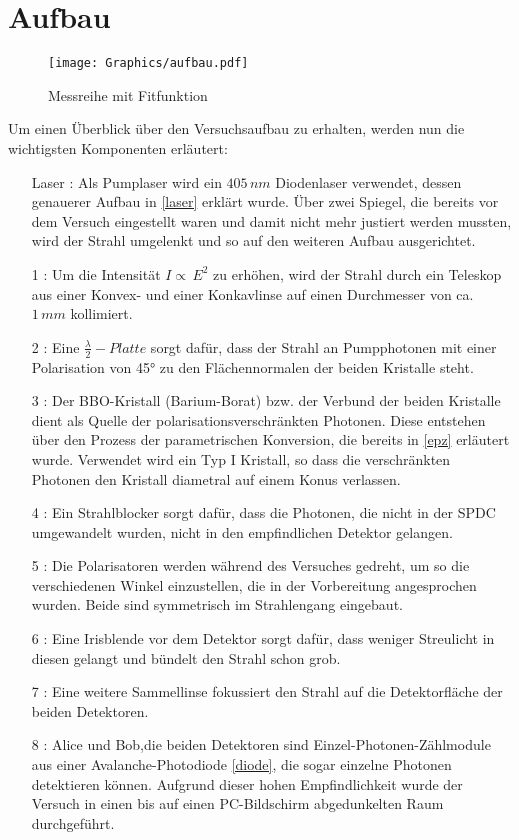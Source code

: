 \documentclass[twoside,colorback,accentcolor=tud4c,11pt]{tudreport}
\begin{document}
\section{Aufbau}
\begin{figure}[H]
\centering
   	\begin{minipage}[b]{1.0\textwidth}
   	\texttt{[image: Graphics/aufbau.pdf]}
   	\caption{Messreihe mit Fitfunktion}
  	\label{3dfit}
   	\end{minipage}
\end{figure}
Um einen Überblick über den Versuchsaufbau zu erhalten, werden nun die wichtigsten Komponenten erläutert:
\begin{itemize}
\item[Laser]: Als Pumplaser wird ein $405\,\si{nm}$ Diodenlaser verwendet, dessen genauerer Aufbau in \ref{laser} erklärt wurde. Über zwei Spiegel, die bereits vor dem Versuch eingestellt waren und damit nicht mehr justiert werden mussten, wird der Strahl umgelenkt und so auf den weiteren Aufbau ausgerichtet.
\item[1]: Um die Intensität $I\propto\,E^2$ zu erhöhen, wird der Strahl durch ein Teleskop aus einer Konvex- und einer Konkavlinse auf einen Durchmesser von ca. $1\,\si{mm}$ kollimiert.
\item[2]: Eine $\frac{\lambda}{2}-Platte$ sorgt dafür, dass der Strahl an Pumpphotonen mit einer Polarisation von 45° zu den Flächennormalen der beiden Kristalle steht.
\item[3]: Der BBO-Kristall (Barium-Borat) bzw. der Verbund der beiden Kristalle dient als Quelle der polarisationsverschränkten Photonen. Diese entstehen über den Prozess der parametrischen Konversion, die bereits in \ref{epz} erläutert wurde. Verwendet wird ein Typ I Kristall, so dass die verschränkten Photonen den Kristall diametral auf einem Konus verlassen.
\item[4]: Ein Strahlblocker sorgt dafür, dass die Photonen, die nicht in der SPDC umgewandelt wurden, nicht in den empfindlichen Detektor gelangen.
\item[5]: Die Polarisatoren werden während des Versuches gedreht, um so die verschiedenen Winkel einzustellen, die in der Vorbereitung angesprochen wurden. Beide sind symmetrisch im Strahlengang eingebaut.
\item[6]: Eine Irisblende vor dem Detektor sorgt dafür, dass weniger Streulicht in diesen gelangt und bündelt den Strahl schon grob.
\item[7]: Eine weitere Sammellinse fokussiert den Strahl auf die Detektorfläche der beiden Detektoren.
\item[8]: Alice und Bob,die beiden Detektoren sind Einzel-Photonen-Zählmodule aus einer Avalanche-Photodiode \ref{diode}, die sogar einzelne Photonen detektieren können. Aufgrund dieser hohen Empfindlichkeit wurde der Versuch in einen bis auf einen PC-Bildschirm abgedunkelten Raum durchgeführt. 
\end{itemize}
\end{document}
